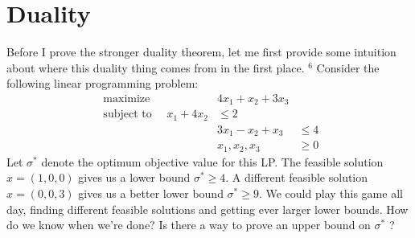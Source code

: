 

\chapter{Duality}

Before I prove the stronger duality theorem, let me first provide some intuition about where this duality thing comes from in the first place. ${ }^{6}$ Consider the following linear programming problem:
\begin{align*}
\text { maximize } & 
4 x_{1}+x_{2}+3 x_{3} \\
\text { subject to } \quad x_{1}+4 x_{2} & \leq 2 \\
& 3 x_{1}-x_{2}+x_{3} & \leq 4 \\
& x_{1}, x_{2}, x_{3} & \geq 0
\end{align*}
Let $\sigma^{*}$ denote the optimum objective value for this LP. The feasible solution $x=(1,0,0)$ gives us a lower bound $\sigma^{*} \geq 4$. A different feasible solution $x=(0,0,3)$ gives us a better lower bound $\sigma^{*} \geq 9$. We could play this game all day, finding different feasible solutions and getting ever larger lower bounds. How do we know when we're done? Is there a way to prove an upper bound on $\sigma^{*}$ ?

